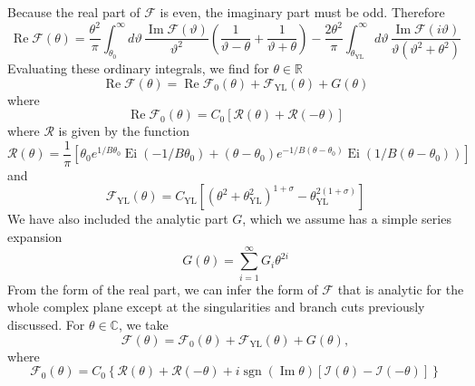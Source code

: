\documentclass[
aps,
pre,
preprint,
longbibliography,
floatfix
]{revtex4-2}
\begin{document}
Because the real part of $\mathcal F$ is even, the imaginary part must be odd. Therefore
\begin{equation} \label{eq:dispersion}
  \operatorname{Re}\mathcal F(\theta)
  =\frac{\theta^2}{\pi}
  \int_{\theta_0}^\infty d\vartheta\,\frac{\operatorname{Im}\mathcal F(\vartheta)}{\vartheta^2}\left(\frac1{\vartheta-\theta}+\frac1{\vartheta+\theta}\right)
  -\frac{2\theta^2}\pi\int_{\theta_{\mathrm{YL}}}^{\infty}d\vartheta\,\frac{\operatorname{Im}\mathcal F(i\vartheta)}{\vartheta(\vartheta^2+\theta^2)}
\end{equation}
Evaluating these ordinary integrals, we find for $\theta\in\mathbb R$
\begin{equation}
  \operatorname{Re}\mathcal F(\theta)=\operatorname{Re}\mathcal F_0(\theta)+\mathcal F_\mathrm{YL}(\theta)+G(\theta)
\end{equation}
where
\begin{equation} \label{eq:2d.real.Fc}
  \operatorname{Re}\mathcal F_0(\theta)
  =C_0[\mathcal R(\theta)+\mathcal R(-\theta)]
\end{equation}
where $\mathcal R$ is given by the function
\begin{equation}
  \mathcal R(\theta)
  =\frac1\pi\left[
    \theta_0e^{1/B\theta_0}\operatorname{Ei}(-1/B\theta_0)
    +(\theta-\theta_0)e^{-1/B(\theta-\theta_0)}\operatorname{Ei}(1/B(\theta-\theta_0))
  \right]
\end{equation}
and
\begin{equation}
  \mathcal F_{\mathrm{YL}}(\theta)=C_{\mathrm{YL}}\left[(\theta^2+\theta_{\mathrm{YL}}^2)^{1+\sigma}-\theta_{\mathrm{YL}}^{2(1+\sigma)}\right]
\end{equation}
We have also included the analytic part $G$, which we assume has a simple series expansion
\begin{equation}
  G(\theta)=\sum_{i=1}^\infty G_i\theta^{2i}
\end{equation}
From the form of the real part, we can infer the form of $\mathcal F$ that is analytic for the whole complex plane except at the singularities and branch cuts previously discussed.
For $\theta\in\mathbb C$, we take
\begin{equation}
  \mathcal F(\theta)=\mathcal F_0(\theta)+\mathcal F_{\mathrm{YL}}(\theta)+G(\theta),
\end{equation}
where
\begin{equation}
  \mathcal F_0(\theta)=C_0\left\{
    \mathcal R(\theta)+\mathcal R(-\theta)
    +i\operatorname{sgn}(\operatorname{Im}\theta)[\mathcal I(\theta)-\mathcal I(-\theta)]
  \right\}
\end{equation}
\end{document}
